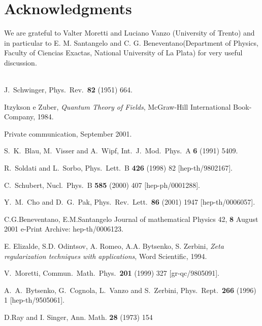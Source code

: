\documentclass [11pt]{article}
\begin{document}
\section{Acknowledgments}
We are grateful to Valter Moretti and Luciano Vanzo (University of Trento) and in  particular to 
E. M. Santangelo and C. G. Beneventano(Department of Physics, Faculty of Ciencias Exactas, National
University of La Plata) for very useful discussion.
\\
\\


\begin{thebibliography}{10}

J.~Schwinger,
Phys.\ Rev.\  {\bf 82} (1951) 664.

Itzykson e Zuber, \emph{Quantum Theory of Fields}, McGraw-Hill International
Book-Company, 1984.

Private communication, September 2001.

S.~K.~Blau, M.~Visser and A.~Wipf,
Int.\ J.\ Mod.\ Phys.\ A {\bf 6} (1991) 5409.

R.~Soldati and L.~Sorbo,
Phys.\ Lett.\ B {\bf 426} (1998) 82
[hep-th/9802167].

C.~Schubert,
Nucl.\ Phys.\ B {\bf 585} (2000) 407
[hep-ph/0001288].

Y.~M.~Cho and D.~G.~Pak,
Phys.\ Rev.\ Lett.\  {\bf 86} (2001) 1947
[hep-th/0006057].

C.G.Beneventano, E.M.Santangelo Journal of mathematical Physics 42, {\bf 8} August 2001 e-Print Archive: hep-th/0006123.

E. Elizalde, S.D. Odintsov, A. Romeo, A.A. Bytsenko, S. Zerbini, 
\emph{Zeta regularization
techniques with applications}, Word Scientific, 1994.


V.~Moretti,
Commun.\ Math.\ Phys.\  {\bf 201} (1999) 327
[gr-qc/9805091].

A.~A.~Bytsenko, G.~Cognola, L.~Vanzo and S.~Zerbini,
Phys.\ Rept.\  {\bf 266} (1996) 1
[hep-th/9505061].

D.Ray and I. Singer,
Ann. Math. {\bf 28} (1973) 154


\end{thebibliography}
\end{document}
